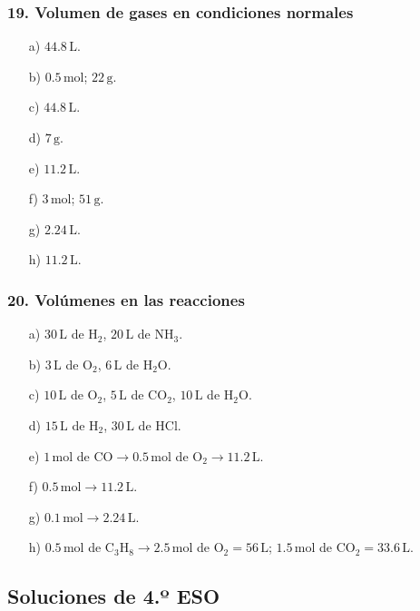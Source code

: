 \subsubsection*{19. Volumen de gases en condiciones normales}
\begin{enumerate}
    \item[a)] $44.8\,\mathrm{L}$.
    \item[b)] $0.5\,\mathrm{mol}$; $22\,\mathrm{g}$.
    \item[c)] $44.8\,\mathrm{L}$.
    \item[d)] $7\,\mathrm{g}$.
    \item[e)] $11.2\,\mathrm{L}$.
    \item[f)] $3\,\mathrm{mol}$; $51\,\mathrm{g}$.
    \item[g)] $2.24\,\mathrm{L}$.
    \item[h)] $11.2\,\mathrm{L}$.
\end{enumerate}

\subsubsection*{20. Volúmenes en las reacciones}
\begin{enumerate}
    \item[a)] $30\,\mathrm{L}$ de $\mathrm{H_2}$,
    $20\,\mathrm{L}$ de $\mathrm{NH_3}$.
    \item[b)] $3\,\mathrm{L}$ de $\mathrm{O_2}$,
    $6\,\mathrm{L}$ de $\mathrm{H_2O}$.
    \item[c)] $10\,\mathrm{L}$ de $\mathrm{O_2}$,
    $5\,\mathrm{L}$ de $\mathrm{CO_2}$,
    $10\,\mathrm{L}$ de $\mathrm{H_2O}$.
    \item[d)] $15\,\mathrm{L}$ de $\mathrm{H_2}$,
    $30\,\mathrm{L}$ de $\mathrm{HCl}$.
    \item[e)] $1\,\mathrm{mol}$ de $\mathrm{CO}\rightarrow
    0.5\,\mathrm{mol}$ de $\mathrm{O_2}\rightarrow11.2\,\mathrm{L}$.
    \item[f)] $0.5\,\mathrm{mol}\rightarrow11.2\,\mathrm{L}$.
    \item[g)] $0.1\,\mathrm{mol}\rightarrow2.24\,\mathrm{L}$.
    \item[h)] $0.5\,\mathrm{mol}$ de $\mathrm{C_3H_8}\rightarrow
    2.5\,\mathrm{mol}$ de $\mathrm{O_2}=56\,\mathrm{L}$;
    $1.5\,\mathrm{mol}$ de $\mathrm{CO_2}=33.6\,\mathrm{L}$.
\end{enumerate}

\subsection{Soluciones de 4.º ESO}

